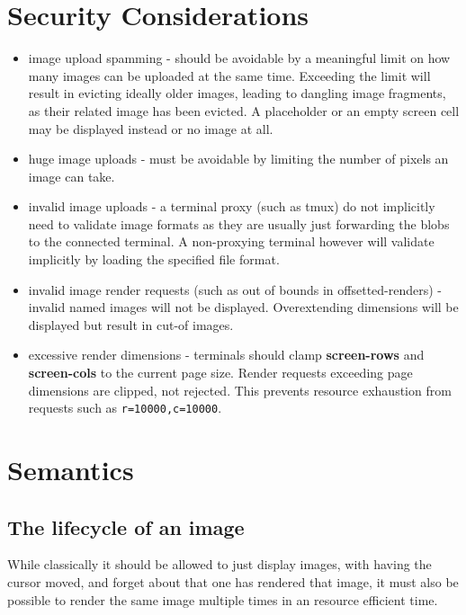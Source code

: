 \documentclass[a4paper]{article}
\newcommand{\code}[1]{\colorbox{light-gray}{\texttt{#1}}}
\begin{document}
\section{Security Considerations} %

\begin{itemize}
    \item image upload spamming - should be avoidable by a meaningful limit
        on how many images can be uploaded at the same time.
        Exceeding the limit will result in evicting ideally older images,
        leading to dangling image fragments, as their related image has been
        evicted. A placeholder or an empty screen cell may be displayed instead or no image at all.
    \item huge image uploads - must be avoidable by limiting the number
        of pixels an image can take.
    \item invalid image uploads - a terminal proxy (such as tmux) do not
        implicitly need to validate image formats as they are usually just
        forwarding the blobs to the connected terminal. A non-proxying
        terminal however will validate implicitly by loading the specified
        file format.
    \item invalid image render requests (such as out of bounds in offsetted-renders) -
        invalid named images will not be displayed.
        Overextending dimensions will be displayed but result in cut-of images.
    \item excessive render dimensions - terminals should clamp
        \textbf{screen-rows} and \textbf{screen-cols} to the current page size.
        Render requests exceeding page dimensions are clipped, not rejected.
        This prevents resource exhaustion from requests such as \code{r=10000,c=10000}.
\end{itemize}

\section{Semantics} %
\subsection{The lifecycle of an image} %

While classically it should be allowed to just display images,
with having the cursor moved, and forget about that one has rendered that
image, it must also be possible to render the same image multiple times
in an resource efficient time.
\end{document}
